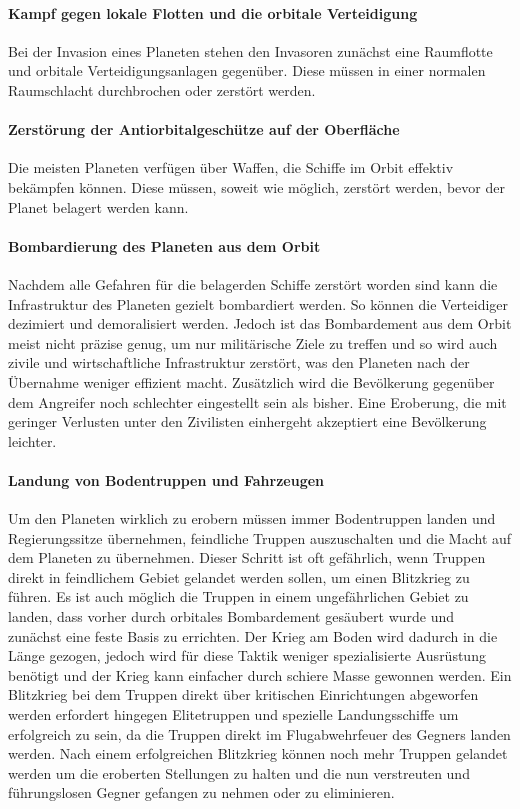 \documentclass[11pt, a4paper]{article}
\begin{document}
\paragraph{Kampf gegen lokale Flotten und die orbitale Verteidigung}
Bei der Invasion eines Planeten stehen den Invasoren zunächst eine Raumflotte und orbitale 
Verteidigungsanlagen gegenüber. Diese müssen in einer normalen Raumschlacht durchbrochen oder zerstört werden.
%
\paragraph{Zerstörung der Antiorbitalgeschütze auf der Oberfläche}
Die meisten Planeten verfügen über Waffen, die Schiffe im Orbit effektiv bekämpfen können. Diese müssen, 
soweit wie möglich, zerstört werden, bevor der Planet belagert werden kann.
%
\paragraph{Bombardierung des Planeten aus dem Orbit}
Nachdem alle Gefahren für die belagerden Schiffe zerstört worden sind kann die Infrastruktur des Planeten 
gezielt bombardiert werden. So können die Verteidiger dezimiert und demoralisiert werden. Jedoch ist das 
Bombardement aus dem Orbit meist nicht präzise genug, um nur militärische Ziele zu treffen und so wird auch
zivile und wirtschaftliche Infrastruktur zerstört, was den Planeten nach der Übernahme weniger effizient 
macht. Zusätzlich wird die Bevölkerung gegenüber dem Angreifer noch schlechter eingestellt sein als bisher.
Eine Eroberung, die mit geringer Verlusten unter den Zivilisten einhergeht akzeptiert eine Bevölkerung 
leichter.
%
\paragraph{Landung von Bodentruppen und Fahrzeugen}
Um den Planeten wirklich zu erobern müssen immer Bodentruppen landen und Regierungssitze übernehmen, 
feindliche Truppen auszuschalten und die Macht auf dem Planeten zu übernehmen. Dieser Schritt ist oft 
gefährlich, wenn Truppen direkt in feindlichem Gebiet gelandet werden sollen, um einen Blitzkrieg zu führen.
Es ist auch möglich die Truppen in einem ungefährlichen Gebiet zu landen, dass vorher durch orbitales 
Bombardement gesäubert wurde und zunächst eine feste Basis zu errichten. Der Krieg am Boden wird dadurch in
die  Länge gezogen, jedoch wird für diese Taktik weniger spezialisierte Ausrüstung benötigt und der Krieg kann
einfacher durch schiere Masse gewonnen werden. Ein Blitzkrieg bei dem Truppen direkt über kritischen 
Einrichtungen abgeworfen werden erfordert hingegen Elitetruppen und spezielle Landungsschiffe um erfolgreich 
zu sein, da die Truppen direkt im Flugabwehrfeuer des Gegners landen werden. Nach einem erfolgreichen 
Blitzkrieg können noch mehr Truppen gelandet werden um die eroberten Stellungen zu halten und die nun 
verstreuten und führungslosen Gegner gefangen zu nehmen oder zu eliminieren.
%
\end{document}
